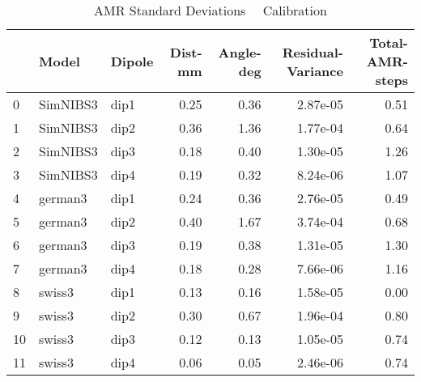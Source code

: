 \documentclass{article}
\begin{document}
\begin{table}
\begin{tabular}{lllrrrr}
\toprule
& Model& Dipole& Dist-mm& Angle-deg& Residual-Variance& Total-AMR-steps\\
\midrule
\rowcolor{lightgray}0 & SimNIBS3 & dip1 & 0.25 & 0.36 & 2.87e-05 & 0.51\\
\rowcolor{lightgray}1 & SimNIBS3 & dip2 & 0.36 & 1.36 & 1.77e-04 & 0.64\\
\rowcolor{lightgray}2 & SimNIBS3 & dip3 & 0.18 & 0.40 & 1.30e-05 & 1.26\\
\rowcolor{lightgray}3 & SimNIBS3 & dip4 & 0.19 & 0.32 & 8.24e-06 & 1.07\\
\rowcolor{yellow}4 & german3 & dip1 & 0.24 & 0.36 & 2.76e-05 & 0.49\\
\rowcolor{yellow}5 & german3 & dip2 & 0.40 & 1.67 & 3.74e-04 & 0.68\\
\rowcolor{yellow}6 & german3 & dip3 & 0.19 & 0.38 & 1.31e-05 & 1.30\\
\rowcolor{yellow}7 & german3 & dip4 & 0.18 & 0.28 & 7.66e-06 & 1.16\\
\rowcolor{pink}8 & swiss3 & dip1 & 0.13 & 0.16 & 1.58e-05 & 0.00\\
\rowcolor{pink}9 & swiss3 & dip2 & 0.30 & 0.67 & 1.96e-04 & 0.80\\
\rowcolor{pink}10 & swiss3 & dip3 & 0.12 & 0.13 & 1.05e-05 & 0.74\\
\rowcolor{pink}11 & swiss3 & dip4 & 0.06 & 0.05 & 2.46e-06 & 0.74\\
\end{tabular}
\caption{AMR Standard Deviations \ \textemdash \ Calibration}
\end{table}
\end{document}
